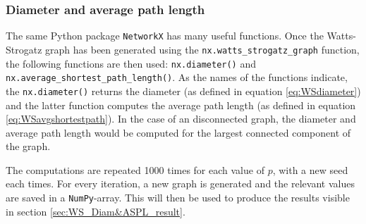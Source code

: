 \subsubsection{Diameter and average path length}

The same Python package \texttt{NetworkX} has many useful functions. Once the Watts-Strogatz graph has been generated using the \texttt{nx.watts\_strogatz\_graph} function, the following functions are then used: \texttt{nx.diameter()} and \texttt{nx.average\_shortest\_path\_length()}. As the names of the functions indicate, the \texttt{nx.diameter()} returns the diameter (as defined in equation \ref{eq:WSdiameter}) and the latter function computes the average path length (as defined in equation \ref{eq:WSavgshortestpath}). In the case of an disconnected graph, the diameter and average path length would be computed for the largest connected component of the graph.

The computations are repeated 1000 times for each value of $p$, with a new seed each times. For every iteration, a new graph is generated and the relevant values are saved in a \texttt{NumPy}-array. This will then be used to produce the results visible in section \ref{sec:WS_Diam&ASPL_result}.
